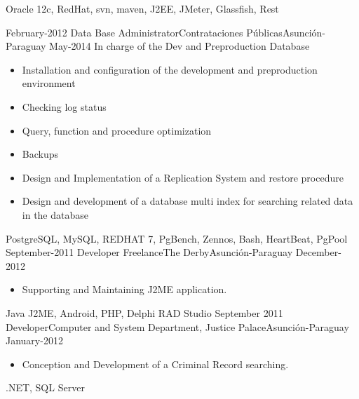 \begin{experiences}
{                }
                {Oracle 12c, RedHat, svn, maven, J2EE, JMeter, Glassfish, Rest}
  \emptySeparator

  \projectexperiences
    {February-2012}   {Data Base Administrator}{Contrataciones Públicas}{Asunción-Paraguay}
    {May-2014} {In charge of the Dev and Preproduction Database}
    {
                      \begin{itemize}
                        \item Installation and configuration of the development  and preproduction environment
                        \item Checking log status
                        \item Query, function and procedure optimization
                        \item Backups
                        \item Design and Implementation of a Replication System and restore procedure
                        \item Design and development of a database multi index for searching related data in the database
                      \end{itemize}
				}
                {PostgreSQL, MySQL, REDHAT 7, PgBench, Zennos, Bash, HeartBeat, PgPool}
  \emptySeparator
  \experience
    {September-2011}   {Developer Freelance}{The Derby}{Asunción-Paraguay}
    {December-2012} {
                      \begin{itemize}
                        \item Supporting and Maintaining J2ME application.
                      \end{itemize}
				}
                {Java J2ME, Android, PHP, Delphi RAD Studio}
  \emptySeparator
  \experience
    {September 2011}   {Developer}{Computer and System Department, Justice Palace}{Asunción-Paraguay}
    {January-2012} {
                      \begin{itemize}
                        \item Conception and Development of a Criminal Record searching.
                      \end{itemize}
				}
                {.NET, SQL Server}
  \emptySeparator
\end{experiences}
